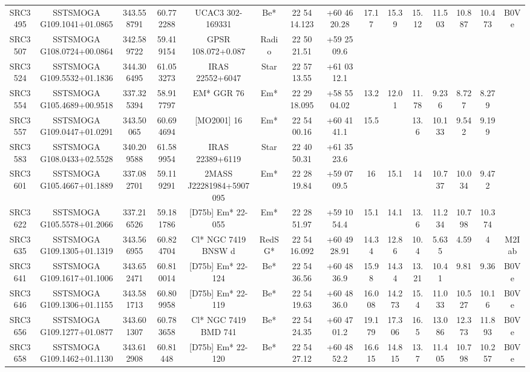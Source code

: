 \begin{table}
\begin{tabular}{ccccccccccccccc}
SRC3495 & SSTSMOGA G109.1041+01.0865 & 343.558791 & 60.772288 & UCAC3 302-169331 & Be* & 22 54 14.123 & +60 46 20.28 & 17.17 & 15.39 & 15.12 & 11.503 & 10.887 & 10.473 & B0Ve \\
SRC3507 & SSTSMOGA G108.0724+00.0864 & 342.589722 & 59.419154 & GPSR 108.072+0.087 & Radio & 22 50 21.51 & +59 25 09.6 &  &  &  &  &  &  &  \\
SRC3524 & SSTSMOGA G109.5532+01.1836 & 344.306495 & 61.053273 & IRAS 22552+6047 & Star & 22 57 13.55 & +61 03 12.1 &  &  &  &  &  &  &  \\
SRC3554 & SSTSMOGA G105.4689+00.9518 & 337.325394 & 58.917797 & EM* GGR   76 & Em* & 22 29 18.095 & +58 55 04.02 & 13.2 & 12.01 & 11.78 & 9.236 & 8.727 & 8.279 &  \\
SRC3557 & SSTSMOGA G109.0447+01.0291 & 343.50065 & 60.694694 & [MO2001]  16 & Em* & 22 54 00.16 & +60 41 41.1 & 15.5 &  & 13.6 & 10.133 & 9.542 & 9.199 &  \\
SRC3583 & SSTSMOGA G108.0433+02.5528 & 340.209588 & 61.589954 & IRAS 22389+6119 & Star & 22 40 50.31 & +61 35 23.6 &  &  &  &  &  &  &  \\
SRC3601 & SSTSMOGA G105.4667+01.1889 & 337.082701 & 59.119291 & 2MASS J22281984+5907095 & Em* & 22 28 19.84 & +59 07 09.5 & 16 & 15.1 & 14 & 10.737 & 10.034 & 9.472 &  \\
SRC3622 & SSTSMOGA G105.5578+01.2066 & 337.216526 & 59.181786 & [D75b] Em* 22-055 & Em* & 22 28 51.97 & +59 10 54.4 & 15.1 & 14.1 & 13.6 & 11.234 & 10.798 & 10.374 &  \\
SRC3635 & SSTSMOGA G109.1305+01.1319 & 343.566955 & 60.824704 & Cl* NGC 7419   BNSW      d & RedSG* & 22 54 16.092 & +60 49 28.91 & 14.34 & 12.86 & 10.4 & 5.635 & 4.59 & 4 & M2Iab \\
SRC3641 & SSTSMOGA G109.1617+01.1006 & 343.652471 & 60.810014 & [D75b] Em* 22-124 & Be* & 22 54 36.56 & +60 48 36.9 & 15.98 & 14.34 & 13.21 & 10.41 & 9.81 & 9.36 & B0Ve \\
SRC3646 & SSTSMOGA G109.1306+01.1155 & 343.581713 & 60.809958 & [D75b] Em* 22-119 & Be* & 22 54 19.63 & +60 48 36.0 & 16.008 & 14.273 & 15.4 & 11.033 & 10.527 & 10.16 & B0Ve \\
SRC3656 & SSTSMOGA G109.1277+01.0877 & 343.601307 & 60.783658 & Cl* NGC 7419    BMD     741 & Be* & 22 54 24.35 & +60 47 01.2 & 19.179 & 17.306 & 16.5 & 13.086 & 12.373 & 11.893 & B0Ve \\
SRC3658 & SSTSMOGA G109.1462+01.1130 & 343.612908 & 60.81448 & [D75b] Em* 22-120 & Be* & 22 54 27.12 & +60 48 52.2 & 16.615 & 14.815 & 13.7 & 11.405 & 10.798 & 10.257 & B0Ve \\

\end{tabular}
\end{table}

